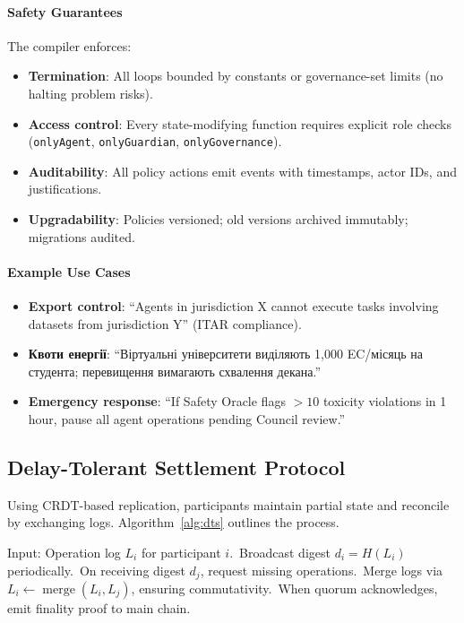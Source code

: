 \documentclass[11pt]{article}
\begin{document}
\paragraph{Safety Guarantees} The compiler enforces:
\begin{itemize}[noitemsep]
  \item \textbf{Termination}: All loops bounded by constants or governance-set limits (no halting problem risks).
  \item \textbf{Access control}: Every state-modifying function requires explicit role checks (\texttt{onlyAgent}, \texttt{onlyGuardian}, \texttt{onlyGovernance}).
  \item \textbf{Auditability}: All policy actions emit events with timestamps, actor IDs, and justifications.
  \item \textbf{Upgradability}: Policies versioned; old versions archived immutably; migrations audited.
\end{itemize}

\paragraph{Example Use Cases}
\begin{itemize}[noitemsep]
  \item \textbf{Export control}: ``Agents in jurisdiction X cannot execute tasks involving datasets from jurisdiction Y'' (ITAR compliance).
  \item \textbf{Квоти енергії}: ``Віртуальні університети виділяють 1,000 EC/місяць на студента; перевищення вимагають схвалення декана.''
  \item \textbf{Emergency response}: ``If Safety Oracle flags $>10$ toxicity violations in 1 hour, pause all agent operations pending Council review.''
\end{itemize}

\subsection{Delay-Tolerant Settlement Protocol}
Using CRDT-based replication, participants maintain partial state and reconcile by exchanging logs. Algorithm~\ref{alg:dts} outlines the process.

\begin{algorithm}[H]
  \caption{Delay-Tolerant Settlement (DTS)}
  \label{alg:dts}
  \begin{algorithmic}[1]
    \STATE Input: Operation log $L_i$ for participant $i$.\
    \STATE Broadcast digest $d_i = H(L_i)$ periodically.\
    \STATE On receiving digest $d_j$, request missing operations.\
    \STATE Merge logs via $L_i \leftarrow \operatorname{merge}(L_i, L_j)$, ensuring commutativity.\
    \STATE When quorum acknowledges, emit finality proof to main chain.\
  \end{algorithmic}
\end{algorithm}
\end{document}
